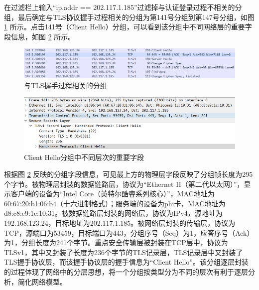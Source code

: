 \qquad
在过滤栏上输入“ip.addr == 202.117.1.185”过滤掉与认证登录过程不相关的分组，最后确定与TLS协议握手过程相关的分组为第141号分组到第147号分组，如图 \ref{fig6} 所示。点击141号（Client Hello）分组，可以看到该分组中不同网络层的重要字段信息，如图 \ref{fig7} 所示。\\
\begin{figure}
	\centering
	\includegraphics[width=12cm]{image/TLS-1}
	\caption{与TLS握手过程相关的分组}
	\label{fig6}
\end{figure}
\begin{figure}
	\centering
	\includegraphics[width=12cm]{image/layer-1}
	\caption{Client Hello分组中不同层次的重要字段}
	\label{fig7}
\end{figure}
\qquad
根据图 \ref{fig7} 反映的分组字段信息，可见最上方的物理层字段反映了分组帧长度为295个字节。被物理层封装的数据链路层，协议为“Ethernet II（第二代以太网）”，显示客户端的设备为“Intel Core（英特尔酷睿系列核心）”，MAC地址为60:67:20:b1:06:b4（十六进制格式）；服务端的设备为phi卡，MAC地址为d8:c8:e9:1c:10:31。被数据链路层封装的网络层，协议为IPv4，源地址为192.168.123.24，目标地址为202.117.1.185。被网络层封装的传输层，协议为TCP，源端口为53459，目标端口为443，分组序号（Seq）为1，应答序号（Ack）为1，分组长度为241个字节。重点安全传输层被封装在TCP层中，协议为TLSv1，其中又封装了长度为236个字节的TLS记录层，TLS记录层中又封装了TLS握手协议层，而该握手协议层的握手信息为“Client Hello”。该分组逐层封装的过程体现了网络中的分层思想，将一个分组按类型分为不同的层次有利于逐层分析，简化网络模型。